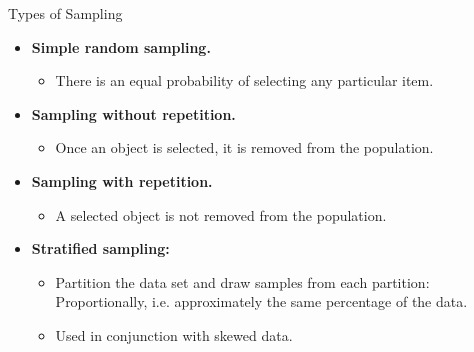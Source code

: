 \begin{frame}{Types of Sampling}
	\begin{itemize}
		\item \textbf{Simple random sampling.}
		      \begin{itemize}
			      \item There is an equal probability of selecting any particular
			            item.
		      \end{itemize}
		\item \textbf{Sampling without repetition.}
		      \begin{itemize}
			      \item Once an object is selected, it is removed from the population.
		      \end{itemize}
		\item \textbf{Sampling with repetition.}
		      \begin{itemize}
			      \item A selected object is not removed from the population.
		      \end{itemize}
		\item \textbf{Stratified sampling:}
		      \begin{itemize}
			      \item Partition the data set and draw samples from each partition:
			            Proportionally, i.e. approximately the same percentage of the data.
			      \item Used in conjunction with skewed data.
		      \end{itemize}
	\end{itemize}
\end{frame}

